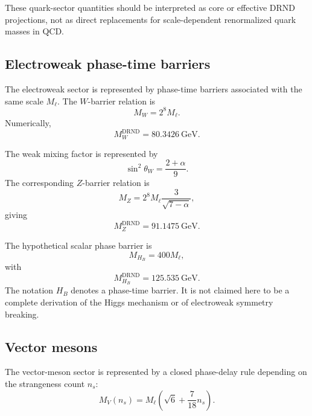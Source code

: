 \documentclass[12pt]{iopart}
\begin{document}
These quark-sector quantities should be interpreted as core or effective DRND projections, not as direct replacements for scale-dependent renormalized quark masses in QCD.

\subsection{Electroweak phase-time barriers}

The electroweak sector is represented by phase-time barriers associated with the same scale \(M_\ell\). The \(W\)-barrier relation is
\begin{equation}
M_W
=
2^8M_\ell.
\label{eq:mw_drnd}
\end{equation}
Numerically,
\begin{equation}
M_W^{\mathrm{DRND}}
=
80.3426~\mathrm{GeV}.
\end{equation}

The weak mixing factor is represented by
\begin{equation}
\sin^2\theta_W
=
\frac{2+\alpha}{9}.
\label{eq:sin2theta_drnd}
\end{equation}
The corresponding \(Z\)-barrier relation is
\begin{equation}
M_Z
=
2^8M_\ell
\frac{3}{\sqrt{7-\alpha}},
\label{eq:mz_drnd}
\end{equation}
giving
\begin{equation}
M_Z^{\mathrm{DRND}}
=
91.1475~\mathrm{GeV}.
\end{equation}

The hypothetical scalar phase barrier is
\begin{equation}
M_{H_B}
=
400M_\ell,
\label{eq:mhb_drnd}
\end{equation}
with
\begin{equation}
M_{H_B}^{\mathrm{DRND}}
=
125.535~\mathrm{GeV}.
\end{equation}
The notation \(H_B\) denotes a phase-time barrier. It is not claimed here to be a complete derivation of the Higgs mechanism or of electroweak symmetry breaking.

\subsection{Vector mesons}

The vector-meson sector is represented by a closed phase-delay rule depending on the strangeness count \(n_s\):
\begin{equation}
M_V(n_s)
=
M_\ell
\left(
\sqrt{6}
+
\frac{7}{18}n_s
\right).
\label{eq:vector_mesons}
\end{equation}
\end{document}
